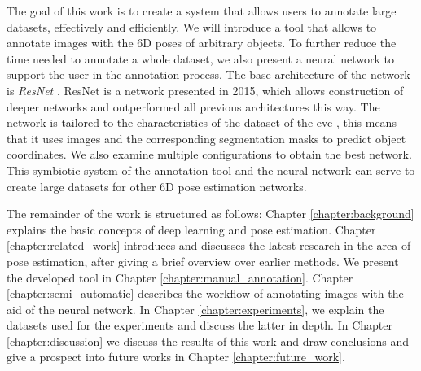 The goal of this work is to create a system that allows users to annotate large datasets, effectively and efficiently. We will introduce a tool that allows to annotate images with the 6D poses of arbitrary objects. To further reduce the time needed to annotate a whole dataset, we also present a neural network to support the user in the annotation process. The base architecture of the network is \textit{ResNet} \cite{resnet}. ResNet is a network presented in 2015, which allows construction of deeper networks and outperformed all previous architectures this way. The network is tailored to the characteristics of the dataset of the \ac{evc} \cite{endovis}, this means that it uses images and the corresponding segmentation masks to predict object coordinates. We also examine multiple configurations to obtain the best network. This symbiotic system of the annotation tool and the neural network can serve to create large datasets for other 6D pose estimation networks.

The remainder of the work is structured as follows: Chapter \ref{chapter:background} explains the basic concepts of deep learning and pose estimation. Chapter \ref{chapter:related_work} introduces and discusses the latest research in the area of pose estimation, after giving a brief overview over earlier methods. We present the developed tool in Chapter \ref{chapter:manual_annotation}. Chapter \ref{chapter:semi_automatic} describes the workflow of annotating images with the aid of the neural network. In Chapter \ref{chapter:experiments}, we explain the datasets used for the experiments and discuss the latter in depth. In Chapter \ref{chapter:discussion} we discuss the results of this work and draw conclusions and give a prospect into future works in Chapter \ref{chapter:future_work}.